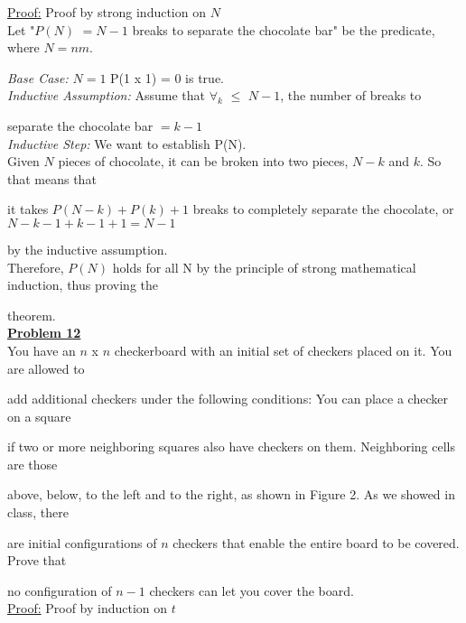 \documentclass[11pt]{article}
\begin{document}
	\underline{Proof:} Proof by strong induction on $N$\\

	Let "$P(N)$ $= N - 1$ breaks to separate the chocolate bar" be the predicate, where $N = nm$.

	\textit{Base Case:} $N=1$ P(1 x 1) = 0 is true. \\
	
	\textit{Inductive Assumption:} Assume that $\forall_k$ $\leq$ $N-1$, the number of breaks to

	separate the chocolate bar $= k - 1$\\

	\textit{Inductive Step:} We want to establish P(N). \\

	Given $N$ pieces of chocolate, it can be broken into two pieces, $N - k$ and $k$. So that means that 

	it takes $P(N-k) + P(k)+1$ breaks to completely separate the chocolate, or $N-k-1 + k-1 +1=N-1$ 

	by the inductive assumption.\\

	Therefore, $P(N)$ holds for all N by the principle of strong mathematical induction, thus proving the 

	theorem.\\


\noindent\textbf{\underline{Problem 12}}\\

	You have an $n$ x $n$ checkerboard with an initial set of checkers placed on it. You are allowed to 

	add additional checkers under the following conditions: You can place a checker on a square 

	if two or more neighboring squares also have checkers on them. Neighboring cells are those

	above, below, to the left and to the right, as shown in Figure 2. As we showed in class, there

	are initial configurations of $n$ checkers that enable the entire board to be covered. Prove that 
	
	no configuration of $n-1$ checkers can let you cover the board.\\

	\underline{Proof:} Proof by induction on $t$\\
\end{document}
